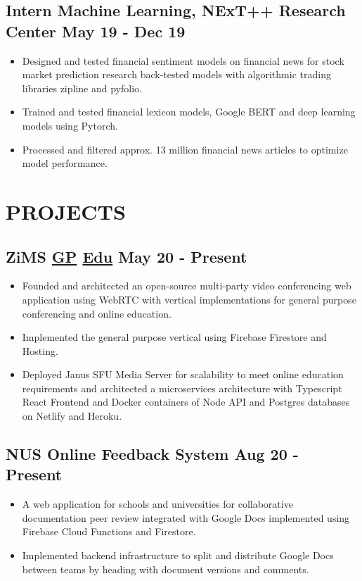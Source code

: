 \documentclass[11pts]{article}
\begin{document}
\subsection*{ Intern Machine Learning, NExT++ Research Center \href{https://github.com/GelliFrancesco/assetpriceprediction}{\faGithub} \hfill May 19 - Dec 19}
\begin{itemize}
    \item Designed and tested financial sentiment models on financial news for stock market prediction research back-tested models with algorithmic trading libraries zipline and pyfolio.
    \item Trained and tested financial lexicon models, Google BERT and deep learning models using Pytorch.
    \item Processed and filtered approx. 13 million financial news articles to optimize model performance.
\end{itemize}

\section*{PROJECTS}

\subsection*{ZiMS \href{https://github.com/yzia2000/zims-mesh}{\faGithub GP} \href{https://github.com/yzia2000/zims}{\faGithub Edu} \hfill May 20 - Present}
\begin{itemize}
    \item Founded and architected an open-source multi-party video conferencing web application using WebRTC with vertical implementations for general purpose conferencing and online education.
    \item Implemented the general purpose vertical using Firebase Firestore and Hosting.
    \item Deployed Janus SFU Media Server for scalability to meet online education requirements and architected a microservices architecture with Typescript React Frontend and Docker containers of Node API and Postgres databases on Netlify and Heroku.
\end{itemize}

\subsection*{NUS Online Feedback System \href{https://youtu.be/LVmKodrE8e0}{\faYoutube} \hfill Aug 20 - Present}
\begin{itemize}
    \item A web application for schools and universities for collaborative documentation peer review integrated with Google Docs implemented using Firebase Cloud Functions and Firestore.
    \item Implemented backend infrastructure to split and distribute Google Docs between teams by heading with document versions and comments.
\end{itemize}
\end{document}
